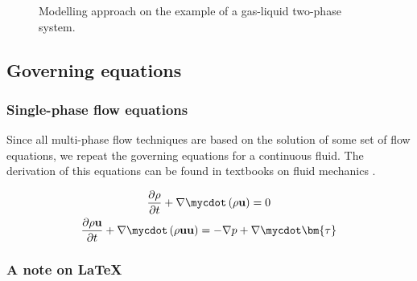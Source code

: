 \begin{figure}[htbp]
  \null\hfill
  \hfill
  \hfill\null
  \caption{Modelling approach on the example of a gas-liquid two-phase system.}
  \label{fig:twoPhaseSim_resolution}
\end{figure}




\subsection{Governing equations}


\subsubsection{Single-phase flow equations}
\label{sec:singlePhaseFlowEquations}

Since all multi-phase flow techniques are based on the solution of some set of flow equations, 
we repeat the governing equations for a continuous fluid. The derivation of this equations can 
be found in textbooks on fluid mechanics \cite{versteegMalalasekera1995,Anderson1995}.

\begin{gather}
	\frac{\partial \rho}{\partial t} + \nabla\mycdot\left( \rho \mathbf{u} \right) = 0 
		\label{eq:genericSinglePhaseContinuityTmp01} \\
	\frac{\partial \rho  \mathbf{u}}{\partial t}
		+ \nabla\mycdot\left( \rho \mathbf{u} \mathbf{u} \right)
		= -\nabla p + \nabla\mycdot\bm{\tau} \label{eq:genericSinglePhaseContinuityTmp02}
\end{gather}


%
%
%
%
%



\subsubsection*{A note on \LaTeX{}}


